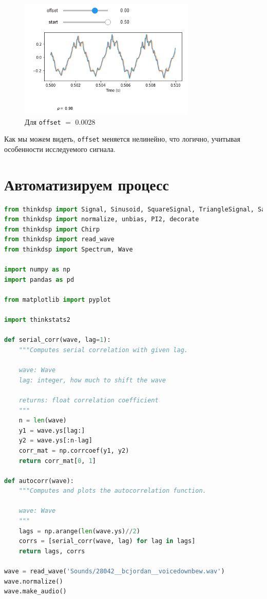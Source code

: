 \documentclass[a4paper,12pt]{report}
\begin{document}
    \begin{figure}[H]
        \centering
        \includegraphics[width=0.75\textwidth]{ex1_28.png}
        \caption{Для \texttt{offset} $=$ 0.0028}
        \label{fig:ex1_28}
    \end{figure}
    
    Как мы можем видеть, \texttt{offset} меняется нелинейно, что логично, учитывая особенности исследуемого сигнала.
    
    \chapter{Автоматизируем процесс}
    
\begin{lstlisting}[language=Python,caption=Берем готовый код и загружаем звук]
from thinkdsp import Signal, Sinusoid, SquareSignal, TriangleSignal, SawtoothSignal, ParabolicSignal
from thinkdsp import normalize, unbias, PI2, decorate
from thinkdsp import Chirp
from thinkdsp import read_wave
from thinkdsp import Spectrum, Wave

import numpy as np
import pandas as pd

from matplotlib import pyplot

import thinkstats2

def serial_corr(wave, lag=1):
    """Computes serial correlation with given lag.

    wave: Wave
    lag: integer, how much to shift the wave

    returns: float correlation coefficient
    """
    n = len(wave)
    y1 = wave.ys[lag:]
    y2 = wave.ys[:n-lag]
    corr_mat = np.corrcoef(y1, y2)
    return corr_mat[0, 1]

def autocorr(wave):
    """Computes and plots the autocorrelation function.

    wave: Wave
    """
    lags = np.arange(len(wave.ys)//2)
    corrs = [serial_corr(wave, lag) for lag in lags]
    return lags, corrs

wave = read_wave('Sounds/28042__bcjordan__voicedownbew.wav')
wave.normalize()
wave.make_audio()
\end{lstlisting}
\end{document}
